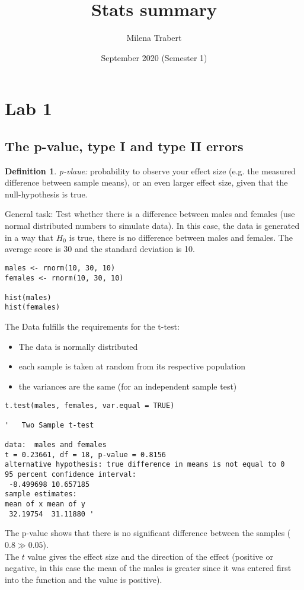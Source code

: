 \documentclass{article}
\title{Stats summary}
\author{Milena Trabert}
\date{September 2020 (Semester 1)}
\theoremstyle{definition}
\newtheorem*{defn}{Definition}
\begin{document}
\maketitle
\tableofcontents

\section{Lab 1}
\subsection{The p-value, type I and type II errors}
\begin{defn}
\textit{p-vlaue:} probability to observe your effect size (e.g. the measured difference between sample means), or an even larger effect size, given that the null-hypothesis is true.
\end{defn}

General task: Test whether there is a difference between males and females (use normal distributed numbers to simulate data). In this case, the data is generated in a way that $H_0$ is true, there is no difference between males and females. The average score is 30 and the standard deviation is 10.

\begin{lstlisting}
males <- rnorm(10, 30, 10)
females <- rnorm(10, 30, 10)

hist(males)
hist(females)
\end{lstlisting}

The Data fulfills the requirements for the t-test:
\begin{itemize}
\item The data is normally distributed
\item each sample is taken at random from its respective population
\item the variances are the same (for an independent sample test)
\end{itemize}

\begin{lstlisting}
t.test(males, females, var.equal = TRUE)

'	Two Sample t-test

data:  males and females
t = 0.23661, df = 18, p-value = 0.8156
alternative hypothesis: true difference in means is not equal to 0
95 percent confidence interval:
 -8.499698 10.657185
sample estimates:
mean of x mean of y 
 32.19754  31.11880 '
\end{lstlisting}
The p-value shows that there is no significant difference between the samples ($0.8 \gg 0.05$). \\
The $t$ value gives the effect size and the direction of the effect (positive or negative, in this case the mean of the males is greater since it was entered first into the function and the value is positive).\par
\end{document}
